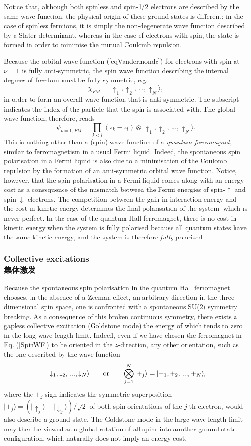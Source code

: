 \documentclass[10pt]{book}
\newcommand{\ua}{\uparrow}
\newcommand{\da}{\downarrow}
\newcommand{\beq}{\begin{equation}}
\newcommand{\eeq}{\end{equation}}
\begin{document}
Notice that, although both spinless and spin-1/2 electrons are described by the same wave function, the physical origin of
these ground states is different: in the case of spinless fermions, it is simply the non-degenerate wave function described
by a Slater determinant, whereas in the case of electrons with spin, the state is formed 
in order to minimise the mutual Coulomb repulsion.

Because the orbital wave function (\ref{eqVandermonde}) for electrons with spin at $\nu=1$ is fully anti-symmetric, the spin
wave function describing the internal degrees of freedom must be fully symmetric, e.g.
\beq\label{SpinWF}
\chi_{FM} = |\ua_1,\ua_2,\, ...,\ua_N\rangle, 
\eeq
in order to form an overall wave function that
is anti-symmetric. The subscript indicates the index of the particle that the spin is associated with. 
The global wave function, therefore, reads
\beq\label{ferro}
\psi_{\nu=1,FM} = \prod_{k<l}(z_k - z_l)\otimes |\ua_1,\ua_2,\, ...,\ua_N\rangle.
\eeq
This is nothing other than a (spin) wave function of a {\sl quantum ferromagnet}, similar to ferromagnetism
in a usual Fermi liquid. Indeed, the spontaneous spin polarisation in a Fermi liquid is also due to a minimisation of the Coulomb 
repulsion by the formation of an anti-symmetric orbital wave function. Notice, however, that the spin polarisation 
in a Fermi liquid comes along with an energy cost as a consequence 
of the mismatch between the Fermi energies of spin-$\ua$ and spin-$\da$ electrons. The competition
between the gain in interaction energy and the cost in kinetic energy determines the final polarisation of the system, which
is never perfect. In the case
of the quantum Hall ferromagnet, there is no cost in kinetic energy when the system is fully polarised because all quantum
states have the same kinetic energy, and the system is therefore {\sl fully} polarised. 

\subsubsection[集体激发]{Collective excitations\\\bf 集体激发} 

Because the spontaneous spin polarisation in the quantum Hall ferromagnet chooses, in the absence of a Zeeman effect, an arbitrary
direction in the three-dimensional spin space, one is confronted with a spontaneous SU(2) symmetry breaking. As a consequence
of this broken continuous symmetry, there exists a gapless collective excitation (Goldstone mode) the energy of which tends
to zero in the long wave-length limit. Indeed, even if we have chosen the ferromagnet in Eq. (\ref{SpinWF})
to be oriented in the $z$-direction, any other orientation, such as the one described by the wave function
$$|\da_1,\da_2,\, ...,\da_N\rangle \qquad {\rm or} \qquad \bigotimes_{j=1}^N|+_j\rangle=|+_1,+_2,\, ...,+_N\rangle,$$
where the $+_j$ sign indicates the symmetric superposition $|+_j\rangle = (|\ua_j\rangle + |\da_j\rangle)/\sqrt{2}$
of both spin orientations of the $j$-th electron, 
would also describe a ground state. The Goldstone mode in the large wave-length limit may then be viewed as a global 
rotation of all spins into another ground-state configuration, which naturally does not imply an energy cost.
\end{document}
